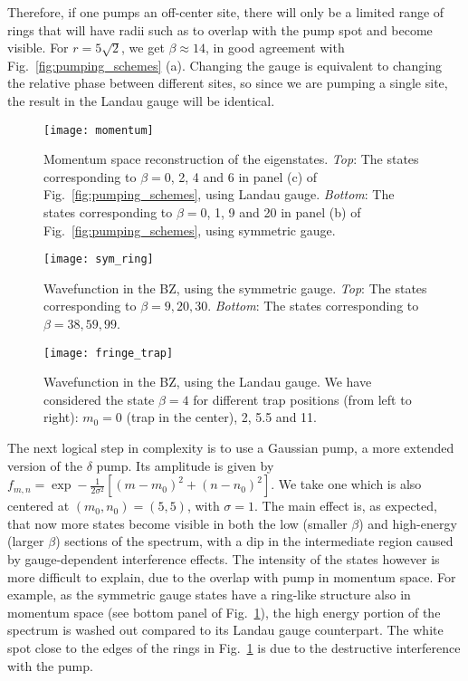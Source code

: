 \documentclass[twocolumn, 10pt, aps, superscriptaddress, floatfix, showpacs, pra, citeautoscript]{revtex4-1}
\newcommand{\co}[2]{#2}
\renewcommand{\paragraph}{\co}
\begin{document}
Therefore, if one pumps an off-center site, there will only be a
limited range of rings that will have radii such as to overlap with
the pump spot and become visible. For $r=5\sqrt{2}$, we get
$\beta \approx 14$, in good agreement with
Fig.~\ref{fig:pumping_schemes} (a). Changing the gauge is equivalent
to changing the relative phase between different sites, so since we
are pumping a single site, the result in the Landau gauge will be identical.


%
\begin{figure}[htb]\centering
  \texttt{[image: momentum]} %
  \caption{Momentum space reconstruction of the
    eigenstates. \emph{Top}: The states corresponding to $\beta=0$, 2,
    4 and 6 in panel (c) of Fig.~\ref{fig:pumping_schemes}, using
    Landau gauge.  \emph{Bottom}: The states corresponding to
    $\beta=0$, 1, 9 and 20 in panel (b) of
    Fig.~\ref{fig:pumping_schemes}, using symmetric gauge.}
  \label{fig:hom_mom_sp}
\end{figure}


\begin{figure}[htb]
  \centering
  \texttt{[image: sym\_ring]} %
  \caption{Wavefunction in the BZ, using the symmetric
    gauge. \emph{Top}: The states corresponding to
    $\beta = 9, 20, 30$.
    \emph{Bottom}:  The states corresponding to
    $\beta = 38, 59, 99$.}
  \label{fig:torus_edge}


\end{figure}

\begin{figure}[htb]
  \centering
  \texttt{[image: fringe\_trap]} %
  \caption{Wavefunction in the BZ, using the Landau gauge. We have
    considered the state $\beta = 4$ for different trap
    positions (from left to right): $m_0 = 0$ (trap in the
    center), 2, 5.5 and 11.}
  \label{fig:moving_trap}
\end{figure}

\paragraph{Gaussian pumping is now bound also in momentum space.}
The next logical step in complexity is to use a Gaussian pump, a more
extended version of the $\delta$ pump. Its amplitude is given by
$f_{m,n} = \exp- \frac{1}{2\sigma^2} \left[(m-m_0)^2 + (n-n_0)^2
\right]$.
We take one which is also centered at $(m_0,n_0) = (5,5)$, with
$\sigma =1$. The main effect is, as expected, that now more states
become visible in both the low (smaller $\beta$) and high-energy
(larger $\beta$) sections of the spectrum, with a dip in the
intermediate region caused by gauge-dependent interference
effects. The intensity of the states however is more difficult to
explain, due to the overlap with pump in momentum space. For example,
as the symmetric gauge states have a ring-like structure also in
momentum space (see bottom panel of Fig.~\ref{fig:hom_mom_sp}), the
high energy portion of the spectrum is washed out compared to its
Landau gauge counterpart. The white spot close to the edges of the
rings in Fig.~\ref{fig:hom_mom_sp} is due to the destructive
interference with the pump.
\end{document}
